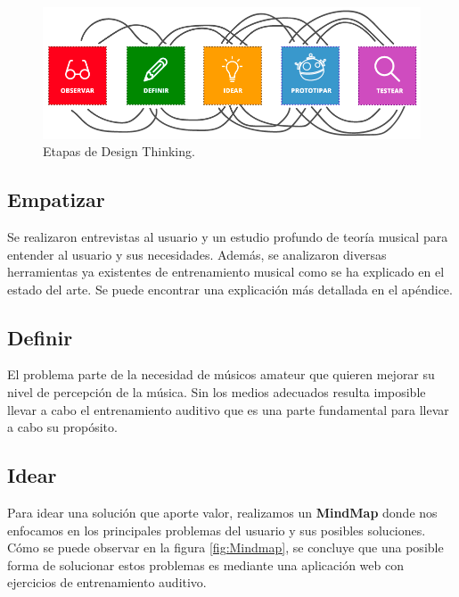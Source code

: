 \documentclass[12pt,twoside,titlepage]{report}
\begin{document}
\begin{figure}[H] 
    \includegraphics[scale=0.44]{Design Thinking/Etapas}
    \centering
    \caption{Etapas de Design Thinking.}
    \label{fig:DesignThinking}
\end{figure}

\subsection{Empatizar}

Se realizaron entrevistas al usuario y un estudio profundo de teoría musical para entender al usuario y sus necesidades. Además, se analizaron diversas herramientas ya existentes de entrenamiento musical como se ha explicado en el estado del arte. Se puede encontrar una explicación más detallada en el apéndice.

\subsection{Definir}

El problema parte de la necesidad de músicos amateur que quieren mejorar su nivel de percepción de la música. Sin los medios adecuados resulta imposible llevar a cabo el entrenamiento auditivo que es una parte fundamental para llevar a cabo su propósito. 

\subsection{Idear}

Para idear una solución que aporte valor, realizamos un \textbf{MindMap} donde nos enfocamos en los principales problemas del usuario y sus posibles soluciones.
Cómo se puede observar en la figura \ref{fig:Mindmap}, se concluye que una posible forma de solucionar estos problemas es mediante una aplicación web con ejercicios de entrenamiento auditivo. 
\end{document}
